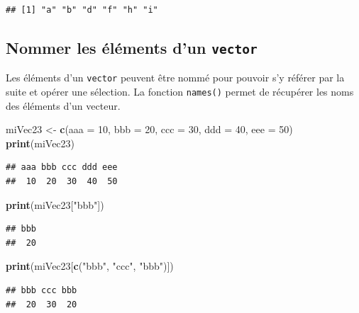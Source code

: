 \documentclass[]{book}
\newenvironment{Shaded}{\begin{snugshade}}{\end{snugshade}}
\newcommand{\KeywordTok}[1]{\textcolor[rgb]{0.13,0.29,0.53}{\textbf{#1}}}
\newcommand{\DataTypeTok}[1]{\textcolor[rgb]{0.13,0.29,0.53}{#1}}
\newcommand{\DecValTok}[1]{\textcolor[rgb]{0.00,0.00,0.81}{#1}}
\newcommand{\StringTok}[1]{\textcolor[rgb]{0.31,0.60,0.02}{#1}}
\newcommand{\NormalTok}[1]{#1}
\begin{document}
\begin{verbatim}
## [1] "a" "b" "d" "f" "h" "i"
\end{verbatim}

\subsection{\texorpdfstring{Nommer les éléments d'un
\texttt{vector}}{Nommer les éléments d'un vector}}\label{nommer-les-elements-dun-vector}

Les éléments d'un \texttt{vector} peuvent être nommé pour pouvoir s'y
référer par la suite et opérer une sélection. La fonction
\texttt{names()} permet de récupérer les noms des éléments d'un vecteur.

\begin{Shaded}
\begin{Highlighting}[]
\NormalTok{miVec23 <-}\StringTok{ }\KeywordTok{c}\NormalTok{(}\DataTypeTok{aaa =} \DecValTok{10}\NormalTok{, }\DataTypeTok{bbb =} \DecValTok{20}\NormalTok{, }\DataTypeTok{ccc =} \DecValTok{30}\NormalTok{, }\DataTypeTok{ddd =} \DecValTok{40}\NormalTok{, }\DataTypeTok{eee =} \DecValTok{50}\NormalTok{)}
\KeywordTok{print}\NormalTok{(miVec23)}
\end{Highlighting}
\end{Shaded}

\begin{verbatim}
## aaa bbb ccc ddd eee 
##  10  20  30  40  50
\end{verbatim}

\begin{Shaded}
\begin{Highlighting}[]
\KeywordTok{print}\NormalTok{(miVec23[}\StringTok{"bbb"}\NormalTok{])}
\end{Highlighting}
\end{Shaded}

\begin{verbatim}
## bbb 
##  20
\end{verbatim}

\begin{Shaded}
\begin{Highlighting}[]
\KeywordTok{print}\NormalTok{(miVec23[}\KeywordTok{c}\NormalTok{(}\StringTok{"bbb"}\NormalTok{, }\StringTok{"ccc"}\NormalTok{, }\StringTok{"bbb"}\NormalTok{)])}
\end{Highlighting}
\end{Shaded}

\begin{verbatim}
## bbb ccc bbb 
##  20  30  20
\end{verbatim}
\end{document}
